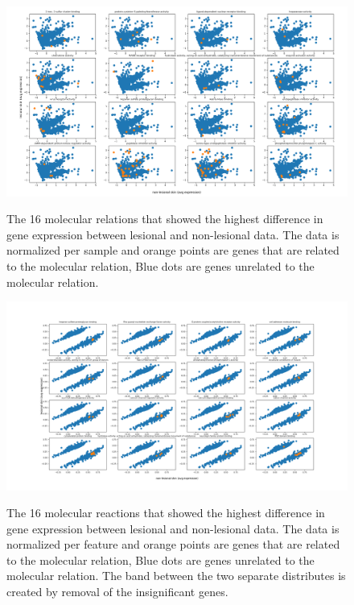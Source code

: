 \documentclass[10pt,a4paper]{article}
\begin{document}
	\begin{figure}[H]
		\includegraphics[width=1\textwidth]{Sign_Molecular_Psoriasis.png}
		\label{fig:MolecularScaledBySample}
		\caption{The 16 molecular relations that showed the highest difference in gene expression between lesional and non-lesional data. The data is normalized per sample and orange points are genes that are related to the molecular relation, Blue dots are genes unrelated to the molecular relation.}
	\end{figure}
	
	\begin{figure}[H]
		\includegraphics[width=1\textwidth]{Sign_Molecular_Psoriasis_Scaled.png}
		\label{fig:MolecularScaledByFeature1}
		\caption{The 16 molecular reactions that showed the highest difference in gene expression between lesional and non-lesional data. The data is normalized per feature and orange points are genes that are related to the molecular relation, Blue dots are genes unrelated to the molecular relation. The band between the two separate distributes is created by removal of the insignificant genes.}
	\end{figure}
\end{document}
